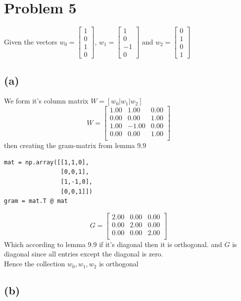 \documentclass[12pt]{article}
\begin{document}
\section*{Problem 5}
Given the vectors
$w_0 =\begin{bmatrix}
    1 \\
    0 \\
    1 \\
    0
\end{bmatrix}$, $ w_1 =\begin{bmatrix}
    1 \\
    0 \\
    -1 \\
    0
\end{bmatrix}$ and $ w_2 = \begin{bmatrix}
    0 \\
    1 \\
    0 \\
    1
\end{bmatrix}$
\subsection*{(a)}
We form it's column matrix $W = [w_0 | w_1 | w_2]$
\[W =
\begin{bmatrix}
1.00 & 1.00 & 0.00 \\
0.00 & 0.00 & 1.00 \\
1.00 & -1.00 & 0.00 \\
0.00 & 0.00 & 1.00 \\
\end{bmatrix}
\]
then creating the gram-matrix from lemma 9.9~\cite{NUMLA}
\begin{lstlisting}
mat = np.array([[1,1,0],
                [0,0,1],
                [1,-1,0],
                [0,0,1]])
gram = mat.T @ mat
\end{lstlisting}
\[
G =
\begin{bmatrix}
2.00 & 0.00 & 0.00 \\
0.00 & 2.00 & 0.00 \\
0.00 & 0.00 & 2.00 \\
\end{bmatrix}
\]
Which according to lemma 9.9 if it's diagonal then it is orthogonal. and $G$ is diagonal since all entries except the diagonal is zero.\\
Hence the collection $w_0, w_1, w_2$ is orthogonal
\subsection*{(b)}
\end{document}
